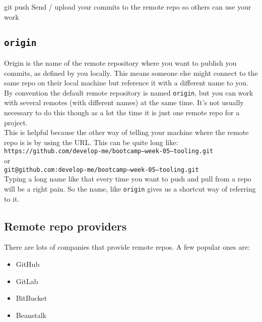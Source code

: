 \begin{infobox}{git push}
	Send / upload your commits to the remote repo so others can use your work 
\end{infobox}


\subsection{\texttt{origin}}

Origin is the name of the remote repository where you want to publish you commits, as defined by you locally. This means someone else might connect to the same repo on their local machine but reference it with a different name to you.
\\

By convention the default remote repository is named \texttt{origin}, but you can work with several remotes (with different names) at the same time. It's not usually necessary to do this though as a lot the time it is just one remote repo for a project.
\\

This is helpful because the other way of telling your machine where the remote repo is is by using the URL. This can be quite long like:
\\

\texttt{https://github.com/develop-me/bootcamp--week-05--tooling.git}
\\

or
\\

\texttt{git@github.com:develop-me/bootcamp--week-05--tooling.git}
\\

Typing a long name like that every time you want to push and pull from a repo will be a right pain. So the name, like \texttt{origin} gives us a shortcut way of referring to it.

\subsection{Remote repo providers}

There are lots of companies that provide remote repos. A few popular ones are:

\begin{itemize}
    \item GitHub
    \item GitLab
    \item BitBucket
	\item Beanstalk
\end{itemize}

